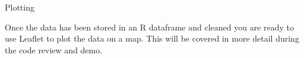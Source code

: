 \documentclass{beamer}
\begin{document}
\begin{frame}{
	\begin{minipage}[t]{0.75\textwidth}
		Plotting
	\end{minipage}
	\hfill
	\begin{minipage}[t]{0.25\textwidth}
		\flushright
	\end{minipage}
}{}
Once the data has been stored in an R dataframe and cleaned you are ready to use Leaflet to plot the data
on a map. This will be covered in more detail during the code review and demo.
\end{frame}
\end{document}

